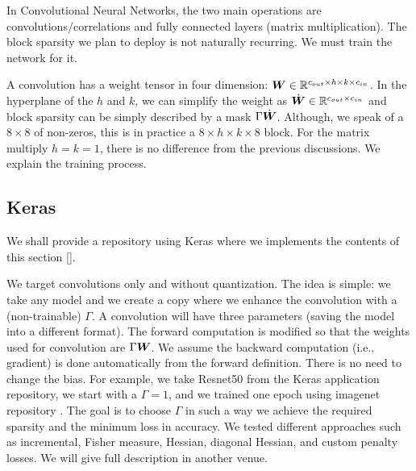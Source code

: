 \documentclass{IEEEtran}
\begin{document}
In Convolutional Neural Networks, the two main operations are
convolutions/correlations and fully connected layers (matrix
multiplication). The block sparsity we plan to deploy is not naturally
recurring.  We must train the network for it.

A convolution has a weight tensor in four dimension: ${\boldsymbol W} \in
\mathbb{R}^{c_{out}\times h \times k \times c_{in}}$. In the hyperplane of the
$h$ and $k$, we can simplify the weight as $\dot{{\boldsymbol W}} \in
\mathbb{R}^{c_{out} \times c_{in}}$ and block sparsity can be simply described
by a mask $\Gamma\dot{{\boldsymbol W}}$. Although, we speak of a $8\times 8$ of
non-zeros, this is in practice a $8\times h\times k\times 8$
block. For the matrix multiply $h=k=1$, there is no difference from
the previous discussions. We explain the training process.


\subsection{Keras}
We shall provide a repository using Keras \cite{chollet2015keras}
where we implements the contents of this section []. %

We target convolutions only and without quantization. The idea is
simple: we take any model and we create a copy where we enhance the
convolution with a (non-trainable) $\Gamma$. A convolution will have
three parameters (saving the model into a different format).  The
forward computation is modified so that the weights used for
convolution are $\Gamma{\boldsymbol W}$. We assume the backward computation
(i.e., gradient) is done automatically from the forward
definition. There is no need to change the bias. For example, we take
Resnet50 from the Keras application repository, we start with a
$\Gamma=1$, and we trained one epoch using imagenet repository
\cite{deng2009imagenet}.  The goal is to choose $\Gamma$ in such a way
we achieve the required sparsity and the minimum loss in accuracy. We
tested different approaches such as incremental, Fisher measure,
Hessian, diagonal Hessian, and custom penalty losses. We will give
full description in another venue.
\end{document}
